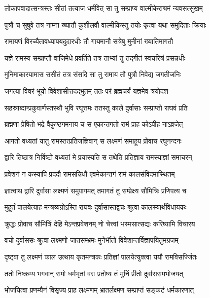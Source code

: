 \twolineshloka
{लोकापवादात्सन्त्रस्तः सीतां तत्याज धर्मवित्}
{सा तु सम्प्राप्य वाल्मीकेराश्रमं न्यवसत्सुखम्}%

\twolineshloka
{पुत्रौ च सुषुवे तत्र नाम्ना ख्यातौ कुशीलवौ}
{वाल्मीकिस्तु तयोः कृत्वा यथा समुदिताः क्रियाः}%

\twolineshloka
{रामायणं विरच्यैतावध्यापयदुदारधीः}
{तौ गायमानौ सत्रेषु मुनीनां ख्यातिमागतौ}%

\twolineshloka
{यज्ञे रामस्य सम्प्राप्तौ वाजिमेधे प्रवर्तिते}
{तत्र ताभ्यां तु तद्गीतं स्वचरित्रं प्रसन्नधीः}%

\twolineshloka
{मुनिमाकारयामास ससीतं तत्र संसदि}
{सा तु रामाय तौ पुत्रौ निवेद्य जगतीजनिः}%

\twolineshloka
{जगत्या विवरं भूयो विवेशासीत्तदद्भुतम्}
{ततः परं ब्रह्मचर्यं यज्ञमेव त्रयोदश}%

\twolineshloka
{सहस्राब्दान्प्रकुवार्णस्तस्थौ भुवि रघूत्तमः}
{ततस्तु काले दुर्वासाः सम्प्राप्तो राघवं प्रति}%

\twolineshloka
{ब्रह्मणा प्रेषितो भद्रे वैकुण्ठगमनाय च}
{स एकान्तगतो रामं प्राह कोऽपीह नाऽव्रजेत्}%

\twolineshloka
{आगतो वध्यतां यातु रामस्तत्प्रतिजज्ञिवान्}
{स लक्ष्मणं समाहूय प्रोवाच रघुनन्दनः}%

\twolineshloka
{द्वारि तिष्ठात्र निर्विष्टो वध्यतां मे प्रयास्यति}
{स तथेति प्रतिज्ञाय रामस्याज्ञां समाचरन्}%

\twolineshloka
{प्रवेशनं न कस्यापि प्रददौ रामसन्निधौ}
{एवमेकान्तगं रामं कालसंविदमास्थितम्}%

\twolineshloka
{ज्ञात्वाथ द्वारि दुर्वासा लक्ष्मणं समुपागमत्}
{तमागतं तु सम्प्रेक्ष्य सौमित्रिः प्रणिपत्य च}%

\twolineshloka
{मुहूर्तं पालयेत्याह मन्त्रव्यग्रोऽस्ति राघवः}
{दुर्वासास्तद्वचः श्रुत्वा कालस्यार्थविधायकः}%

\twolineshloka
{क्रुद्धः प्रोवाच सौमित्रिं देहि मेऽन्तप्रवेशनम्}
{नो चेत्त्वां भस्मसात्सद्यः करिष्यामि विचारय}%

\twolineshloka
{वचो दुर्वाससः श्रुत्वा लक्ष्मणो जातसम्भ्रमः}
{मुनेर्भीतो विवेशान्तर्विज्ञापयितुमग्रजम्}%

\twolineshloka
{दृष्ट्वा तु लक्ष्मणं काल उत्थाय कृतमन्त्रकः}
{प्रतिज्ञां पालयेत्युक्त्वा ययौ रामविसर्ज्जितः}%

\twolineshloka
{ततो निष्क्रम्य भगवान् रामो धर्मभृतां वरः}
{प्रतोष्य तं मुनिं प्रीतो दुर्वाससमभोजयत्}%

\twolineshloka
{भोजयित्वा प्रणम्यैनं विसृज्य प्राह लक्ष्मणम्}
{भ्रातर्लक्ष्मण सम्प्राप्तं सङ्कटं धर्मकारणात्}%


